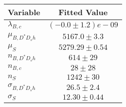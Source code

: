 \begin{tabular}[t]{lc}
\hline
Variable &Fitted Value\\
\hline\hline
$\lambda_{B,c}$&$(-0.0\pm1.2)e-09$\\
\hline
$\mu_{B, D^* D_s h}$&$5167.0\pm3.3$\\
\hline
$\mu_S$&$5279.29\pm0.54$\\
\hline
$n_{B, D^* D_s h}$&$614\pm29$\\
\hline
$n_{B,c}$&$28\pm28$\\
\hline
$n_S$&$1242\pm30$\\
\hline
$\sigma_{B, D^* D_s h}$&$26.5\pm2.4$\\
\hline
$\sigma_S$&$12.30\pm0.44$\\
\hline
\end{tabular}